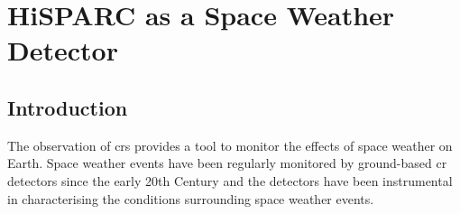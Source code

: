 \chapter{HiSPARC as a Space Weather Detector}\label{chap:HiSPARC}

\section{Introduction}\label{sec:HS_intro}

%
%
%
%


The observation of \glspl{cr} provides a tool to monitor the effects of space weather on Earth. Space weather events have been regularly monitored by ground-based \gls{cr} detectors since the early 20th Century \citep{forbush_effects_1937, kudela_cosmic_2000, schwenn_space_2006} and the detectors have been instrumental in characterising the conditions surrounding space weather events.

